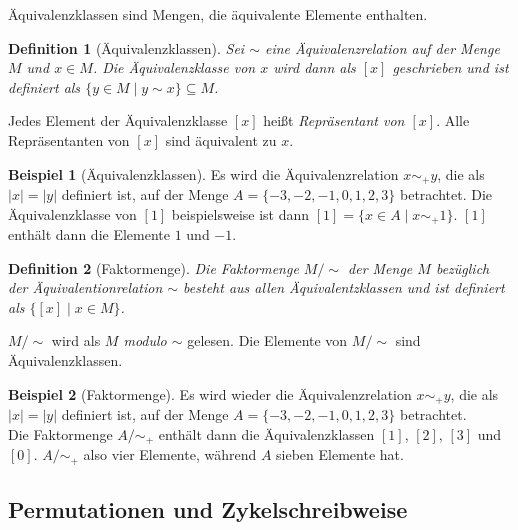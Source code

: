 \documentclass[12pt,a4paper, usenames, dvipsnames]{article}
\theoremstyle{mystyle}
\newtheorem{definition}{Definition}
\theoremstyle{definition}
\newtheorem{bsp}{Beispiel}[definition]
\begin{document}
Äquivalenzklassen sind Mengen, die äquivalente Elemente enthalten.

\begin{definition}[Äquivalenzklassen]

Sei $ \sim $ eine Äquivalenzrelation auf der Menge $M$ und $x \in M$. Die Äquivalenzklasse von $x$ wird dann als $[x]$ geschrieben und ist definiert als $\{y \in M \mid y \sim x\} \subseteq M$.  

\end{definition}

Jedes Element der Äquivalenzklasse $[x]$ heißt \textit{Repräsentant von $[x]$}. Alle Repräsentanten von $[x]$ sind äquivalent zu $x$.

\begin{bsp}[Äquivalenzklassen]
Es wird die Äquivalenzrelation $x \sim_+ y$, die als $|x| =|y|$ definiert ist, auf der Menge $A=\{ -3, -2, -1, 0, 1, 2, 3 \}$ betrachtet. Die Äquivalenzklasse von $[1]$ beispielsweise ist dann $[1] = \{x \in A \mid x \sim_+ 1\}$. $[1]$ enthält dann die Elemente $1$ und $-1$.

\end{bsp}

\begin{definition}[Faktormenge]

Die Faktormenge $M / \sim $ der Menge $M$ bezüglich der Äquivalentionrelation $\sim$ besteht aus allen Äquivalentzklassen und ist definiert als $\{ [x] \mid x \in M \}$.

\end{definition}

$M / \sim $ wird als \textit{$M$ modulo $\sim$} gelesen. Die Elemente von $M / \sim $ sind Äquivalenzklassen.

\begin{bsp}[Faktormenge]

Es wird wieder die Äquivalenzrelation $x \sim_+ y$, die als $|x| =|y|$ definiert ist, auf der Menge $A=\{ -3, -2, -1, 0, 1, 2, 3 \}$ betrachtet.  \\
Die Faktormenge $A / \sim_+$ enthält dann die Äquivalenzklassen $[1]$, $[2]$, $[3]$ und $[0]$. $A / \sim_+$ also vier Elemente, während $A$ sieben Elemente hat.

\end{bsp}



%
%
%
%
%
%
%
%
%
%
%
%
%
\subsection{Permutationen und Zykelschreibweise} 
 \label{Abschnitt_PermutationZykel}
\end{document}
